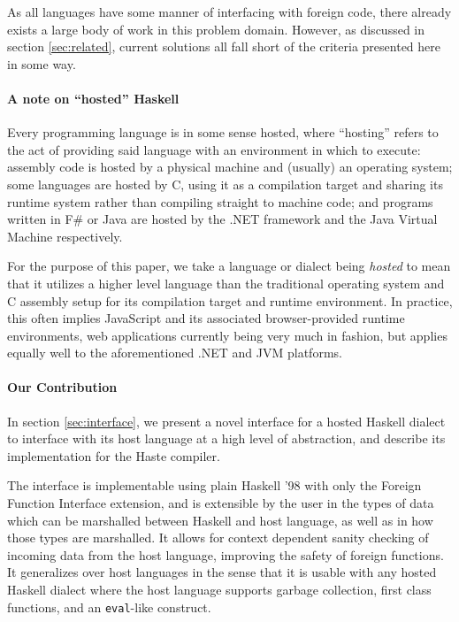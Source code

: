 \documentclass{sigplanconf}
\begin{document}
As all languages have some manner of interfacing with foreign code, there
already exists a large body of work in this problem domain. However, as
discussed in section \ref{sec:related}, current solutions all fall short of
the criteria presented here in some way.

\paragraph{A note on ``hosted'' Haskell}
Every programming language is in some sense hosted, where ``hosting'' refers
to the act of providing said language with an environment in which to execute:
assembly code is hosted by a physical machine and (usually) an operating
system; some languages are hosted by C, using it as a compilation target and
sharing its runtime system rather than compiling straight to machine code;
and programs written in F\# or Java are hosted by the .NET framework and the
Java Virtual Machine respectively.

For the purpose of this paper, we take a language or dialect being
\emph{hosted} to mean that it utilizes a higher level language than the
traditional operating system and C assembly setup for its compilation target
and runtime environment. In practice, this often implies JavaScript and its
associated browser-provided runtime environments, web applications currently
being very much in fashion, but applies equally well to the aforementioned
.NET and JVM platforms.

\paragraph{Our Contribution}\label{sec:contrib}
In section \ref{sec:interface}, we present a novel interface for a hosted
Haskell dialect to interface with its host language at a high level of
abstraction, and describe its implementation for the Haste compiler.
\ \cite{haste}

The interface is implementable using plain Haskell '98 with only the Foreign
Function Interface extension, and is extensible by the user in the types of
data which can be marshalled between Haskell and host language, as well as in
how those types are marshalled. It allows for context dependent sanity
checking of incoming data from the host language, improving the safety
of foreign functions. It generalizes over host languages in the sense that it
is usable with any hosted Haskell dialect where the host language supports
garbage collection, first class functions, and an \lstinline!eval!-like
construct.
\end{document}
